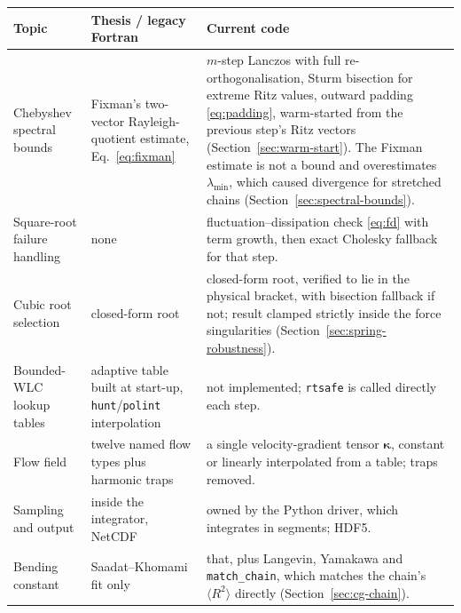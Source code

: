 \documentclass[11pt,a4paper]{report}
\newcommand{\code}[1]{\texttt{\seqsplitcode{#1}}}
\newcommand{\seqsplitcode}[1]{#1}
\begin{document}
\begin{longtable}{@{}p{}p{}p{}@{}}
\toprule
Topic & Thesis / legacy Fortran & Current code \\
\midrule
\endhead
Chebyshev spectral bounds
  & Fixman's two-vector Rayleigh-quotient estimate, Eq.~\eqref{eq:fixman}
  & $m$-step Lanczos with full re-orthogonalisation, Sturm bisection for extreme
    Ritz values, outward padding \eqref{eq:padding}, warm-started from the previous
    step's Ritz vectors (Section~\ref{sec:warm-start}). The Fixman estimate is not
    a bound and overestimates $\lambda_{\min}$, which caused divergence for
    stretched chains (Section~\ref{sec:spectral-bounds}). \\
\addlinespace
Square-root failure handling
  & none
  & fluctuation--dissipation check \eqref{eq:fd} with term growth, then exact
    Cholesky fallback for that step. \\
\addlinespace
Cubic root selection
  & closed-form root
  & closed-form root, verified to lie in the physical bracket, with bisection
    fallback if not; result clamped strictly inside the force singularities
    (Section~\ref{sec:spring-robustness}). \\
\addlinespace
Bounded-WLC lookup tables
  & adaptive table built at start-up, \code{hunt}/\code{polint} interpolation
  & not implemented; \code{rtsafe} is called directly each step. \\
\addlinespace
Flow field
  & twelve named flow types plus harmonic traps
  & a single velocity-gradient tensor $\bm{\kappa}$, constant or linearly
    interpolated from a table; traps removed. \\
\addlinespace
Sampling and output
  & inside the integrator, NetCDF
  & owned by the Python driver, which integrates in segments; HDF5. \\


\addlinespace
Bending constant
  & Saadat--Khomami fit only
  & that, plus Langevin, Yamakawa and \code{match\_chain}, which matches the
    chain's $\langle R^2\rangle$ directly (Section~\ref{sec:cg-chain}). \\


\end{longtable}
\end{document}
